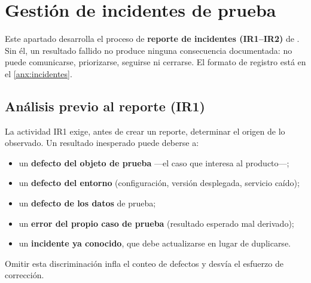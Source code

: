 \section{Gestión de incidentes de prueba}
\label{sec:gestion-incidentes}

\begin{notanormativa}
Este apartado desarrolla el proceso de \textbf{reporte de incidentes (IR1–IR2)} de .
Sin él, un resultado fallido no produce ninguna consecuencia documentada: no puede comunicarse,
priorizarse, seguirse ni cerrarse. El formato de registro está en el \ref{anx:incidentes}.
\end{notanormativa}

\begin{observacion}
\end{observacion}

\subsection{Análisis previo al reporte (IR1)}

\begin{notanormativa}
La actividad IR1 exige, antes de crear un reporte, determinar el origen de lo observado. Un
resultado inesperado puede deberse a:
\begin{itemize}
  \item un \textbf{defecto del objeto de prueba} —el caso que interesa al producto—;
  \item un \textbf{defecto del entorno} (configuración, versión desplegada, servicio caído);
  \item un \textbf{defecto de los datos} de prueba;
  \item un \textbf{error del propio caso de prueba} (resultado esperado mal derivado);
  \item un \textbf{incidente ya conocido}, que debe actualizarse en lugar de duplicarse.
\end{itemize}
Omitir esta discriminación infla el conteo de defectos y desvía el esfuerzo de corrección.
\end{notanormativa}

